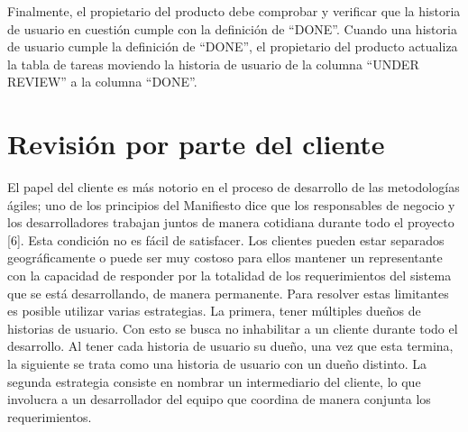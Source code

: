 Finalmente, el propietario del producto debe comprobar y verificar que la historia de usuario en cuestión cumple con la definición de \enquote{DONE}. Cuando una historia de usuario cumple la definición de \enquote{DONE}, el propietario del producto actualiza la tabla de tareas moviendo la historia de usuario de la columna \enquote{UNDER REVIEW} a la columna \enquote{DONE}.

\section{Revisión por parte del cliente}
El papel del cliente es más notorio en el proceso de desarrollo de las metodologías ágiles; uno de los principios del Manifiesto dice que los responsables de negocio y los desarrolladores trabajan juntos de manera cotidiana durante todo el proyecto [6]. Esta condición no es fácil de satisfacer. Los clientes pueden estar separados geográficamente o puede ser muy costoso para ellos mantener un representante con la capacidad de responder por la totalidad de los requerimientos del sistema que se está desarrollando, de manera permanente.
Para resolver estas limitantes es posible utilizar varias estrategias. La primera, tener múltiples dueños de historias de usuario. Con esto se busca no inhabilitar a un cliente durante todo el desarrollo. Al tener cada historia de usuario su dueño, una vez que esta termina, la siguiente se trata como una historia de usuario con un dueño distinto. La segunda estrategia consiste en nombrar un intermediario del cliente, lo que involucra a un desarrollador del equipo que coordina de manera conjunta los requerimientos.